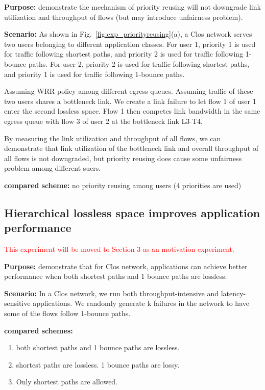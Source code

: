 \textbf{Purpose:} demonstrate the mechanism of priority reusing will not downgrade link utilization and throughput of flows (but may introduce unfairness problem).

\textbf{Scenario:} As shown in Fig.~\ref{fig:exp_priorityreusing}(a), a Clos network serves two users belonging to different application classes. For user 1, priority 1 is used for traffic following shortest paths, and priority 2 is used for traffic following 1-bounce paths. For user 2, priority 2 is used for traffic following shortest paths, and priority 1 is used for traffic following 1-bounce paths.

Assuming WRR policy among different egress queues. Assuming traffic of these two users shares a bottleneck link. We create a link failure to let flow 1 of user 1 enter the second lossless space. Flow 1 then competes link bandwidth in the same egress queue with flow 3 of user 2 at the bottleneck link L3-T4. 

By measuring the link utilization and throughput of all flows, we can demonstrate that link utilization of the bottleneck link and overall throughput of all flows is not downgraded, but priority reusing does cause some unfairness problem among different suers.

\textbf{compared scheme:} no priority reusing among users (4 priorities are used)
  
\subsection{Hierarchical lossless space improves application performance}\label{subsec:exp_appperformance}

\textcolor{red}{This experiment will be moved to Section 3 as an motivation experiment.}

\textbf{Purpose:} demonstrate that for Clos network, applications can achieve better performance when both shortest paths and 1 bounce paths are lossless.

\textbf{Scenario:} In a Clos network, we run both throughput-intensive and latency-sensitive applications. We randomly generate k failures in the network to have some of the flows follow 1-bounce paths.

 \textbf{compared schemes:}
 \begin{enumerate}
 	\item both shortest paths and  1 bounce paths are lossless.
 	\item shortest paths are lossless. 1 bounce paths are lossy.
 	\item Only shortest paths are allowed.
 \end{enumerate}
  
